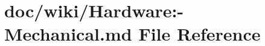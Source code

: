 \hypertarget{_hardware_1-_mechanical_8md}{}\section{doc/wiki/\+Hardware\+:-\/\+Mechanical.md File Reference}
\label{_hardware_1-_mechanical_8md}
